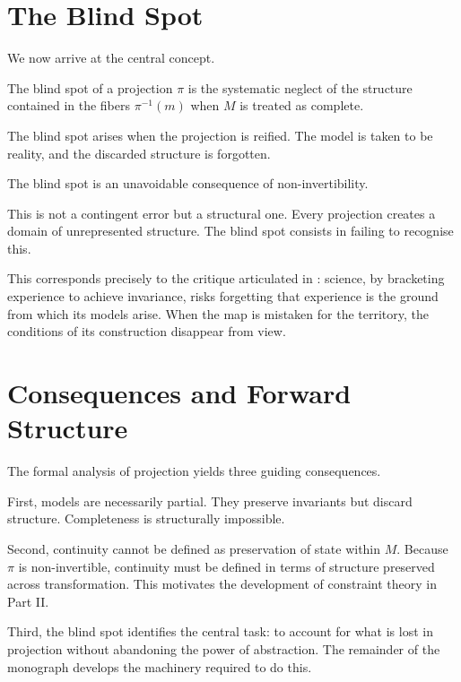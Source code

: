 \documentclass[11pt,openany]{book}
\begin{document}
\section{The Blind Spot}
\label{sec:blind-spot}

We now arrive at the central concept.

\begin{definition}
The blind spot of a projection $\pi$ is the systematic neglect of the structure contained in the fibers $\pi^{-1}(m)$ when $M$ is treated as complete.
\end{definition}

The blind spot arises when the projection is reified. The model is taken to be reality, and the discarded structure is forgotten.

\begin{proposition}
The blind spot is an unavoidable consequence of non-invertibility.
\end{proposition}

This is not a contingent error but a structural one. Every projection creates a domain of unrepresented structure. The blind spot consists in failing to recognise this.

This corresponds precisely to the critique articulated in : science, by bracketing experience to achieve invariance, risks forgetting that experience is the ground from which its models arise. When the map is mistaken for the territory, the conditions of its construction disappear from view.

\section{Consequences and Forward Structure}
\label{sec:forward}

The formal analysis of projection yields three guiding consequences.

First, models are necessarily partial. They preserve invariants but discard structure. Completeness is structurally impossible.

Second, continuity cannot be defined as preservation of state within $M$. Because $\pi$ is non-invertible, continuity must be defined in terms of structure preserved across transformation. This motivates the development of constraint theory in Part II.

Third, the blind spot identifies the central task: to account for what is lost in projection without abandoning the power of abstraction. The remainder of the monograph develops the machinery required to do this.
\end{document}

